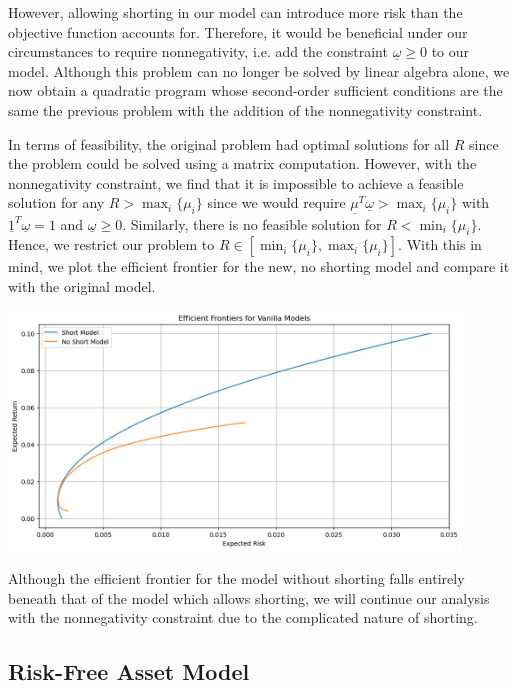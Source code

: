 \documentclass{article}
\renewcommand{\vec}[1]{\underline{#1}}
\theoremstyle{definition}
\begin{document}
However, allowing shorting in our model can introduce more risk than the objective function accounts for. Therefore, it would be beneficial under our circumstances to require nonnegativity, i.e. add the constraint $\vec\omega \geq 0$ to our model. Although this problem can no longer be solved by linear algebra alone, we now obtain a quadratic program whose second-order sufficient conditions are the same the previous problem with the addition of the nonnegativity constraint. 

In terms of feasibility, the original problem had optimal solutions for all $R$ since the problem could be solved using a matrix computation. However, with the nonnegativity constraint, we find that it is impossible to achieve a feasible solution for any $R > \max_i\{\mu_i\}$ since we would require $\vec\mu^T\vec\omega > \max_i\{\mu_i\}$ with $\vec 1^T \vec\omega = 1$ and $\vec\omega \geq 0$. Similarly, there is no feasible solution for $R < \min_i\{\mu_i\}$. Hence, we restrict our problem to $R \in [\min_i\{ \mu_i \}, \max_i\{ \mu_i \}]$. With this in mind, we plot the efficient frontier for the new, no shorting model and compare it with the original model. 

\begin{minipage}{0.49\textwidth}
\begin{center}
	\includegraphics[width=0.9\textwidth]{shortVsNoShort.png}
\end{center}
\end{minipage}
\begin{minipage}{0.5\textwidth}
Although the efficient frontier for the model without shorting falls entirely beneath that of the model which allows shorting, we will continue our analysis with the nonnegativity constraint due to the complicated nature of shorting. 
\end{minipage}


\subsection{Risk-Free Asset Model}
\end{document}
